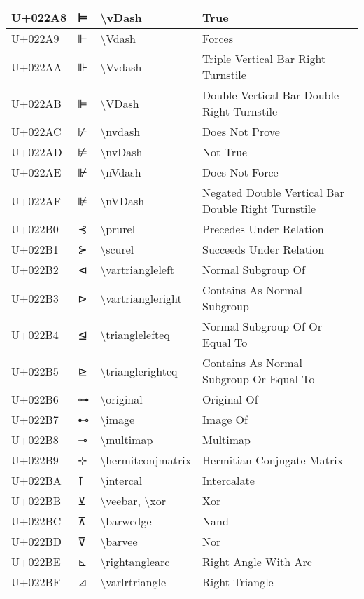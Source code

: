 \begin{table}[h]
\begin{tabulary}{\linewidth}{|L|L|L|L|}
\hline
U+022A8 & ⊨ & {\textbackslash}vDash & True \\
\hline
U+022A9 & ⊩ & {\textbackslash}Vdash & Forces \\
\hline
U+022AA & ⊪ & {\textbackslash}Vvdash & Triple Vertical Bar Right Turnstile \\
\hline
U+022AB & ⊫ & {\textbackslash}VDash & Double Vertical Bar Double Right Turnstile \\
\hline
U+022AC & ⊬ & {\textbackslash}nvdash & Does Not Prove \\
\hline
U+022AD & ⊭ & {\textbackslash}nvDash & Not True \\
\hline
U+022AE & ⊮ & {\textbackslash}nVdash & Does Not Force \\
\hline
U+022AF & ⊯ & {\textbackslash}nVDash & Negated Double Vertical Bar Double Right Turnstile \\
\hline
U+022B0 & ⊰ & {\textbackslash}prurel & Precedes Under Relation \\
\hline
U+022B1 & ⊱ & {\textbackslash}scurel & Succeeds Under Relation \\
\hline
U+022B2 & ⊲ & {\textbackslash}vartriangleleft & Normal Subgroup Of \\
\hline
U+022B3 & ⊳ & {\textbackslash}vartriangleright & Contains As Normal Subgroup \\
\hline
U+022B4 & ⊴ & {\textbackslash}trianglelefteq & Normal Subgroup Of Or Equal To \\
\hline
U+022B5 & ⊵ & {\textbackslash}trianglerighteq & Contains As Normal Subgroup Or Equal To \\
\hline
U+022B6 & ⊶ & {\textbackslash}original & Original Of \\
\hline
U+022B7 & ⊷ & {\textbackslash}image & Image Of \\
\hline
U+022B8 & ⊸ & {\textbackslash}multimap & Multimap \\
\hline
U+022B9 & ⊹ & {\textbackslash}hermitconjmatrix & Hermitian Conjugate Matrix \\
\hline
U+022BA & ⊺ & {\textbackslash}intercal & Intercalate \\
\hline
U+022BB & ⊻ & {\textbackslash}veebar, {\textbackslash}xor & Xor \\
\hline
U+022BC & ⊼ & {\textbackslash}barwedge & Nand \\
\hline
U+022BD & ⊽ & {\textbackslash}barvee & Nor \\
\hline
U+022BE & ⊾ & {\textbackslash}rightanglearc & Right Angle With Arc \\
\hline
U+022BF & ⊿ & {\textbackslash}varlrtriangle & Right Triangle \\

\end{tabulary}
\end{table}
